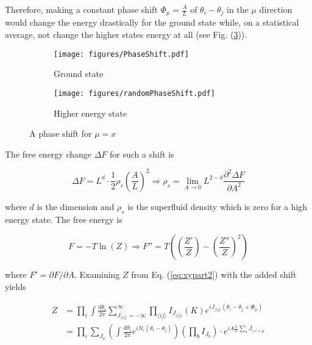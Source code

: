Therefore, making a constant phase shift $\Phi_\mu = \frac{A}{L}$ of $\theta_i - \theta_j$ in the $\mu$ direction would change the energy drastically for the ground state while, on a statistical average, not change the higher states energy at all (see Fig. (\ref{fig:xyphaseshift})).

\begin{figure}[h!]
\centering
    \begin{subfigure}{.4\textwidth}
        \centering
        \texttt{[image: figures/PhaseShift.pdf]}
        \caption{Ground state}
        \label{fig:xyground}
    \end{subfigure}
    \begin{subfigure}{.4\textwidth}
        \centering
        \texttt{[image: figures/randomPhaseShift.pdf]}
        \caption{Higher energy state}
        \label{fig:xyhigher}
    \end{subfigure}
    \caption{A phase shift for $\mu = x$}
\label{fig:xyphaseshift}
\end{figure}

The free energy change $\Delta F$ for such a shift is

\begin{equation}
    \Delta F = L^d \cdot \frac{1}{2} \rho_s \left( \frac{A}{L} \right)^2 \Rightarrow \rho_s = \lim_{A \to 0} L^{2 - d}\frac{\partial^2 \Delta F}{\partial A^2}
\end{equation}

\noindent where $d$ is the dimension and $\rho_s$ is the superfluid density which is zero for a high energy state. The free energy is

\begin{equation}
F = - T \ln(Z) \Rightarrow F'' = T \left(\left(\frac{Z'}{Z}\right) - \left( \frac{Z''}{Z} \right)^2 \right)
\label{eq:xyfreeenergy}
\end{equation}

\noindent where $F' = \partial F / \partial A$. Examining $Z$ from Eq. (\ref{eq:xypart2}) with the added shift yields

\begin{align}
    Z &= \prod_i \int \frac{\mathrm d \theta_i}{2 \pi} \sum_{J_{\langle ij \rangle} = -\infty}^{\infty} \prod_{\langle ij \rangle} I_{J_{\langle ij \rangle}} ( K ) e^{i J_{\langle ij \rangle} (\theta_i - \theta_j + \Phi_\mu)} \\
%
    & = \prod_i \sum_{J_b} \left ( \int \frac{\mathrm d \theta_i}{2 \pi} e^{i N_i (\theta_i - \theta_j)} \right ) \left ( \prod_b I_{J_b} \right ) \cdot e^{i A \frac{1}{L} \sum_i J_{i, i+\mu}} \\
\label{eq:xypart3}
\end{align}



